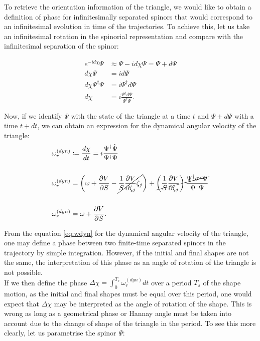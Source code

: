 To retrieve the orientation information of the triangle, we would like to obtain a definition of phase for infinitesimally separated spinors that would correspond to an infinitesimal evolution in time of the trajectories. To achieve this, let us take an infinitesimal rotation in the spinorial representation and compare with the infinitesimal separation of the spinor:

\begin{align*}
e^{-id\chi}\Psi &\approx \Psi -id\chi\Psi = \Psi + d\Psi\\
d\chi\Psi &= id\Psi \\
d\chi\Psi^\dagger\Psi &= i\Psi^\dagger d\Psi\\
d\chi &= i\frac{\Psi^\dagger d\Psi}{\Psi^\dagger\Psi}.
\end{align*}

Now, if we identify $\Psi$ with the state of the triangle at a time $t$ and $\Psi+d\Psi$ with a time $t+dt$, we can obtain an expression for the dynamical angular velocity of the triangle:\\

\begin{align}
\omega_r^{(dyn)} &\coloneqq \frac{d\chi}{dt} = i\frac{\Psi^\dagger\dot{\Psi}}{\Psi^\dagger\Psi}\nonumber\\
\nonumber\\
\omega_r^{(dyn)}&= \left( \omega +\frac{\partial V}{\partial S}-\cancel{\frac{1}{S}\frac{\partial V}{\partial \zeta_j}\zeta_j} \right) + \cancel{\left( \frac{1}{S}\frac{\partial V}{\partial \zeta_j} \right)\frac{ \Psi^\dagger \sigma^j\Psi}{\Psi^\dagger \Psi}}\nonumber\\
\nonumber\\
\omega_r^{(dyn)} &= \omega + \frac{\partial V}{\partial S}.
\label{eq:wdyn}
\end{align}

From the equation \eqref{eq:wdyn} for the dynamical angular velocity of the triangle, one may define a phase between two finite-time separated spinors in the trajectory by simple integration. However, if the initial and final shapes are not the same, the interpretation of this phase as an angle of rotation of the triangle is not possible.\\

If we then define the phase $\Delta \chi = \int_0^{T_s}\omega_r^{(dyn)}dt$ over a period $T_s$ of the shape motion, as the initial and final shapes must be equal over this period, one would expect that $\Delta \chi$ may be interpreted as the angle of rotation of the shape. This is wrong as long as a geometrical phase or Hannay angle \cite{hannay} must be taken into account due to the change of shape of the triangle in the period. To see this more clearly, let us parametrise the spinor $\Psi$:

